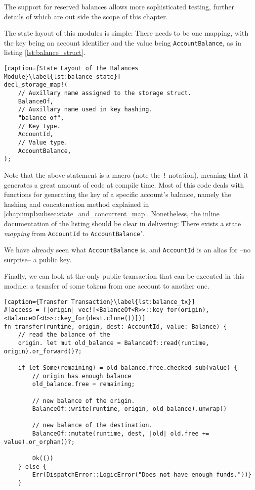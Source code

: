 The support for reserved balances allows more sophisticated testing, further details of which are
out side the scope of this chapter.

The state layout of this modules is simple: There needs to be one mapping, with the key being an
account identifier and the value being \texttt{AccountBalance}, as in listing
\ref{lst:balance_struct}.

\begin{lstlisting}[caption={State Layout of the Balances Module}\label{lst:balance_state}]
decl_storage_map!(
	// Auxillary name assigned to the storage struct.
	BalanceOf,
	// Auxillary name used in key hashing.
	"balance_of",
	// Key type.
	AccountId,
	// Value type.
	AccountBalance,
);
\end{lstlisting}

Note that the above statement is a macro (note the \texttt{!} notation), meaning that it generates a
great amount of code at compile time. Most of this code deals with functions for generating the key
of a specific account's balance, namely the hashing and concatenation method explained in
\ref{chap:impl:subsec:state_and_concurrent_map}. Nonetheless, the inline documentation of the
listing should be clear in delivering: There exists a state \textit{mapping} from \texttt{AccountId}
to \texttt{AccountBalance}".

We have already seen what \texttt{AccountBalance} is, and \texttt{AccountId} is an alias for --no
surprise-- a public key.

Finally, we can look at the only public transaction that can be executed in this module: a transfer
of some tokens from one account to another one.

\begin{lstlisting}[caption={Transfer Transaction}\label{lst:balance_tx}]
#[access = (|origin| vec![<BalanceOf<R>>::key_for(origin), <BalanceOf<R>>::key_for(dest.clone())])]
fn transfer(runtime, origin, dest: AccountId, value: Balance) {
	// read the balance of the
	origin. let mut old_balance = BalanceOf::read(runtime, origin).or_forward()?;

	if let Some(remaining) = old_balance.free.checked_sub(value) {
		// origin has enough balance
		old_balance.free = remaining;

		// new balance of the origin.
		BalanceOf::write(runtime, origin, old_balance).unwrap()

		// new balance of the destination.
		BalanceOf::mutate(runtime, dest, |old| old.free += value).or_orphan()?;

		Ok(())
	} else {
		Err(DispatchError::LogicError("Does not have enough funds."))}
	}
\end{lstlisting}

